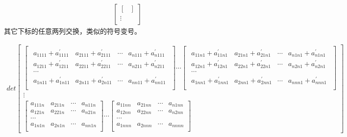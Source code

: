 \documentclass[twoside,a4paper,CCT]{cctart}   %
\begin{document}
\begin{list}{}
\begin{align*}
\begin{bmatrix}
\begin{bmatrix}
  \end{bmatrix}\\
\vdots\\
    \end{bmatrix}
\end{align*}
 其它下标的任意两列交换，类似的符号变号。
 \item
\begin{align*}
 det\begin{bmatrix}
 \begin{bmatrix}\begin{smallmatrix}
 a_{1111} + a_{1111}^{'}& a_{2111} + a_{2111}^{'}&\cdots&a_{n111} + a_{n111}^{'}\\
 a_{1211} + a_{1211}^{'}& a_{2211} + a_{2211}^{'}&\cdots&a_{n211} + a_{n211}^{'}\\
 \cdots\\
a_{1n11} + a_{1n11}^{'}& a_{2n11} + a_{2n11}^{'}&\cdots&a_{nn11} + a_{nn11}^{'}\\
\end{smallmatrix}\end{bmatrix}
\cdots
\begin{bmatrix}\begin{smallmatrix}
  a_{11n1} + a_{11n1}^{'}& a_{21n1} + a_{21n1}^{'}&\cdots&a_{n1n1} + a_{n1n1}^{'}\\
a_{12n1} + a_{12n1}^{'}& a_{22n1} + a_{22n1}^{'}&\cdots&a_{n2n1} + a_{n2n1}^{'}\\
 \cdots\\
 a_{1nn1} + a_{1nn1}^{'}& a_{2nn1} + a_{2nn1}^{'}&\cdots&a_{nnn1} + a_{nnn1}^{'}\\
 \end{smallmatrix}\end{bmatrix}\\
\vdots\\
\begin{bmatrix}
  a_{111n}& a_{211n}&\cdots&a_{n11n}\\
  a_{121n}& a_{221n}&\cdots&a_{n21n}\\
  \cdots\\
  a_{1n1n}& a_{2n1n}&\cdots&a_{nn1n}\\
  \end{bmatrix}
\cdots
\begin{bmatrix}
  a_{11nn}& a_{21nn}&\cdots&a_{n1nn}\\
  a_{12nn}& a_{22nn}&\cdots&a_{n2nn}\\
   \cdots\\
   a_{1nnn}& a_{2nnn}&\cdots&a_{nnnn}\\

\end{bmatrix}
\end{bmatrix}
\end{align*}
\end{list}
\end{document}
